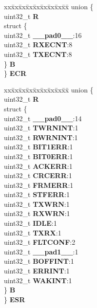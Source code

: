 \begin{DoxyCompactItemize}
\begin{tabbing}
\end{tabbing}\item 
\mbox{\label{structFLEXCAN__tag_a726515343de107889e5d4c6ceca87c76}} 
\begin{tabbing}
xx\=xx\=xx\=xx\=xx\=xx\=xx\=xx\=xx\=\kill
union \{\\
\>uint32\_t {\bfseries R}\\
\>struct \{\\
\>\>uint32\_t {\bfseries \_\_pad0\_\_}:16\\
\>\>uint32\_t {\bfseries RXECNT}:8\\
\>\>uint32\_t {\bfseries TXECNT}:8\\
\>\} {\bfseries B}\\
\} {\bfseries ECR}\\

\end{tabbing}\item 
\mbox{\label{structFLEXCAN__tag_a51b6893ed4fca6386e21971d9315f3c0}} 
\begin{tabbing}
xx\=xx\=xx\=xx\=xx\=xx\=xx\=xx\=xx\=\kill
union \{\\
\>uint32\_t {\bfseries R}\\
\>struct \{\\
\>\>uint32\_t {\bfseries \_\_pad0\_\_}:14\\
\>\>uint32\_t {\bfseries TWRNINT}:1\\
\>\>uint32\_t {\bfseries RWRNINT}:1\\
\>\>uint32\_t {\bfseries BIT1ERR}:1\\
\>\>uint32\_t {\bfseries BIT0ERR}:1\\
\>\>uint32\_t {\bfseries ACKERR}:1\\
\>\>uint32\_t {\bfseries CRCERR}:1\\
\>\>uint32\_t {\bfseries FRMERR}:1\\
\>\>uint32\_t {\bfseries STFERR}:1\\
\>\>uint32\_t {\bfseries TXWRN}:1\\
\>\>uint32\_t {\bfseries RXWRN}:1\\
\>\>uint32\_t {\bfseries IDLE}:1\\
\>\>uint32\_t {\bfseries TXRX}:1\\
\>\>uint32\_t {\bfseries FLTCONF}:2\\
\>\>uint32\_t {\bfseries \_\_pad1\_\_}:1\\
\>\>uint32\_t {\bfseries BOFFINT}:1\\
\>\>uint32\_t {\bfseries ERRINT}:1\\
\>\>uint32\_t {\bfseries WAKINT}:1\\
\>\} {\bfseries B}\\
\} {\bfseries ESR}\\


\end{tabbing}
\end{DoxyCompactItemize}
